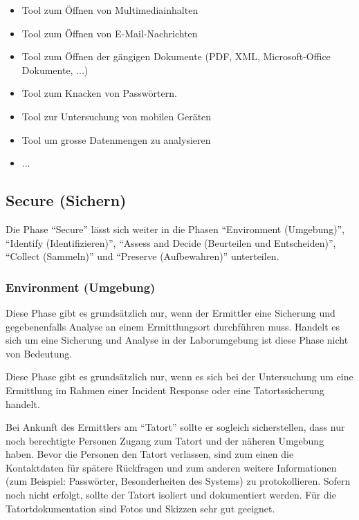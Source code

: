 \begin{itemize}
\begin{itemize}
\item Tool zum Öffnen von Multimediainhalten
\item Tool zum Öffnen von E-Mail-Nachrichten
\item Tool zum Öffnen der gängigen Dokumente (PDF, XML, Microsoft-Office Dokumente, ...)
\item Tool zum Knacken von Passwörtern.
\item Tool zur Untersuchung von mobilen Geräten
\item Tool um grosse Datenmengen zu analysieren
\item ...
\end{itemize}
\end{itemize}


\subsection{Secure (Sichern)}
Die Phase "`Secure"' lässt sich weiter in die Phasen "`Environment (Umgebung)"', "`Identify (Identifizieren)"', "`Assess and Decide (Beurteilen und Entscheiden)"', "`Collect (Sammeln)"' und "`Preserve (Aufbewahren)"' unterteilen.


\subsubsection{Environment (Umgebung)}
Diese Phase gibt es grundsätzlich nur, wenn der Ermittler eine Sicherung und gegebenenfalls Analyse an einem Ermittlungsort durchführen muss. Handelt es sich um eine Sicherung und Analyse in der Laborumgebung ist diese Phase nicht von Bedeutung.

Diese Phase gibt es grundsätzlich nur, wenn es sich bei der Untersuchung um eine Ermittlung im Rahmen einer Incident Response oder eine Tatortssicherung handelt.

Bei Ankunft des Ermittlers am "`Tatort"' sollte er sogleich sicherstellen, dass nur noch berechtigte Personen Zugang zum Tatort und der näheren Umgebung haben. Bevor die Personen den Tatort verlassen, sind zum einen die Kontaktdaten für spätere Rückfragen und zum anderen weitere Informationen (zum Beispiel: Passwörter, Besonderheiten des Systems) zu protokollieren. Sofern noch nicht erfolgt, sollte der Tatort isoliert und dokumentiert werden. Für die Tatortdokumentation sind Fotos und Skizzen sehr gut geeignet.

